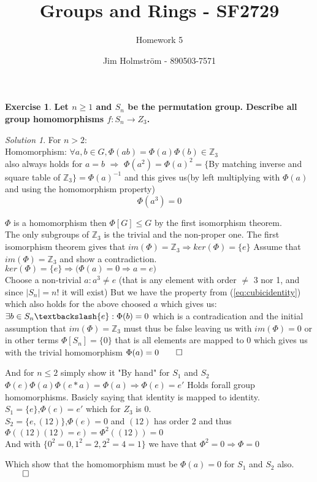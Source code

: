 \documentclass[a4paper,twoside=false,abstract=false,numbers=noenddot,
titlepage=false,headings=small,parskip=half,version=last]{scrartcl}
\author{Jim Holmström - 890503-7571}
\title{Groups and Rings - SF2729}
\subtitle{Homework 5}
\theoremstyle{definition}
\newtheorem{exercise}{Exercise}
\theoremstyle{remark}
\newtheorem*{solution}{Solution}
\newcommand{\ZZ}{\ensuremath{\mathbb{Z}}}
\begin{document}
\maketitle
\thispagestyle{empty}

\begin{exercise}
{\bf
Let $n \ge 1$ and $S_n$ be the permutation group. 
Describe all group homomorphisms $f : S_n \rightarrow Z_3$.
}
\end{exercise}
\begin{solution}

For $n>2$:\\

Homomorphism: $\forall a,b \in G, \Phi(ab)=\Phi(a)\Phi(b) \in \ZZ_3$\\
also always holds for $a=b$ $\Rightarrow$ $\Phi(a^2)=\Phi(a)^2=\{$By matching inverse and square table of $\ZZ_3\}=\Phi(a)^{-1}$ 
and this gives us(by left multiplying with $\Phi(a)$ and using the homomorphism property)
\begin{equation}
\label{eq:cubicidentity}
    \Phi(a^3)=0
\end{equation}


$\Phi$ is a homomorphism then $\Phi \left[ G \right] \le G$ by the first isomorphism theorem.\\
The only subgroups of $\ZZ_3$ is the trivial and the non-proper one.
The first isomorphism theorem gives that $im(\Phi)=\ZZ_3 \Rightarrow ker(\Phi)=\{e\}$
Assume that $im(\Phi)=\ZZ_3$ and show a contradiction.\\
$ker(\Phi)=\{e\} \Rightarrow \bigg( \Phi(a)=0 \Rightarrow a=e \bigg)$\\
Choose a non-trivial $a : a^3 \neq e $ (that is any element with order $\neq$ 3
nor 1, and since $|S_n|=n!$ it will exist)
But we have the property from (\ref{eq:cubicidentity}) which also holds for the above choosed $a$ which gives us:\\
$\exists b \in S_n \textbackslash \{e\} : \Phi(b)=0$ which is a contradication and the initial assumption that $im(\Phi)=\ZZ_3$ must thus be false leaving us with 
$im(\Phi)={0}$ or in other terms $\Phi \left[ S_n \right]=\{0\}$ that is all elements are mapped to $0$ which gives us with the trivial homomorphism $\Phi(a)=0 \qed$

And for $n \le 2$ simply show it "By hand" for $S_1$ and $S_2$\\

$\Phi(e)\Phi(a)\Phi(e*a)=\Phi(a) \Rightarrow \Phi(e)=e'$ Holds forall group
homomorphisms. Basicly saying that identity is mapped to identity.\\
$S_1=\{e\}$,$\Phi(e)=e'$ which for $Z_3$ is 0. \\
$S_2=\{e,(1 2)\}$,$\Phi(e)=0$ and $(1 2)$ has order 2 and thus $\Phi((1 2)(1
2)=e)=\Phi^2((1 2))=0$\\
And with $\{0^2=0,1^2=2,2^2=4=1\}$ we have that $\Phi^2=0 \Rightarrow \Phi=0$

Which show that the homomorphism must be $\Phi(a)=0$ for $S_1$ and $S_2$ also.
$\qed$

\end{solution}
\end{document}
